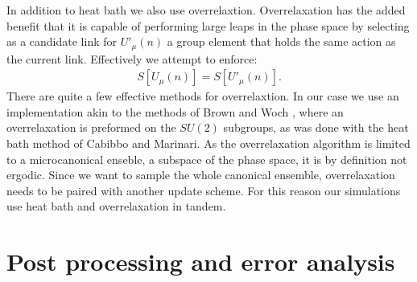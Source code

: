\documentclass[english,twoside,openright]{UH_TCM_MSc}
\begin{document}
In addition to heat bath we also use overrelaxtion. Overrelaxation has the added benefit that it is capable of performing large leaps in the phase space by selecting as a candidate link for $U'_\mu(n)$ a group element that holds the same action as the current link. Effectively we attempt to enforce:
\begin{align}
    S[U_\mu(n)] = S[U'_\mu(n)].
\end{align}
There are quite a few effective methods for overrelaxtion. In our case we use an implementation akin to the methods of Brown and Woch \cite{Brown}, where an overrelaxation is preformed on the $SU(2)$ subgroups, as was done with the heat bath method of Cabibbo and Marinari. As the overrelaxation algorithm is limited to a microcanonical enseble, a subspace of the phase space, it is by definition not ergodic. Since we want to sample the whole canonical ensemble, overrelaxation needs to be paired with another update scheme. For this reason our simulations use heat bath and overrelaxation in tandem. 

\section{Post processing and error analysis}
\end{document}
